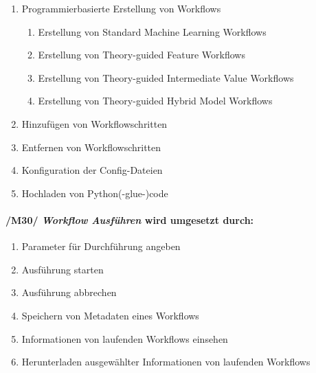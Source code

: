 \renewcommand{\labelenumi}{/FA\arabic{enumi}0/}
\renewcommand{\labelenumii}{/FA\arabic{enumi}\arabic{enumii}/}
\begin{enumerate}
    \setcounter{enumi}{\value{FAs}}
    \setlength\itemsep{-1em}
    \item Programmierbasierte Erstellung von Workflows
    \vspace{-5mm}
    \begin{enumerate}
        \setlength\itemsep{-1em}
        \item Erstellung von Standard Machine Learning Workflows %
        \item Erstellung von Theory-guided Feature Workflows %
        \item Erstellung von Theory-guided Intermediate Value Workflows %
        \item Erstellung von Theory-guided Hybrid Model Workflows %
    \end{enumerate}
    \renewcommand{\labelenumi}{/FA\arabic{enumi}0/}
    \item Hinzufügen von Workflowschritten
    \item Entfernen von Workflowschritten
    \item Konfiguration der Config-Dateien
    \item Hochladen von \gls{Python}(-glue-)code%
    \setcounter{FAs}{\value{enumi}}
\end{enumerate}

\paragraph{/M30/ \textit{Workflow Ausführen} wird umgesetzt durch:}

\begin{enumerate}
    \setlength\itemsep{-1em}
    \setcounter{enumi}{\value{FAs}}
    \item Parameter für Durchführung angeben
    \item Ausführung starten
    \item Ausführung abbrechen
    \item Speichern von Metadaten eines Workflows
    \item Informationen von laufenden Workflows einsehen
    \item Herunterladen ausgewählter Informationen von laufenden Workflows
    \setcounter{FAs}{\value{enumi}}
\end{enumerate}
    
